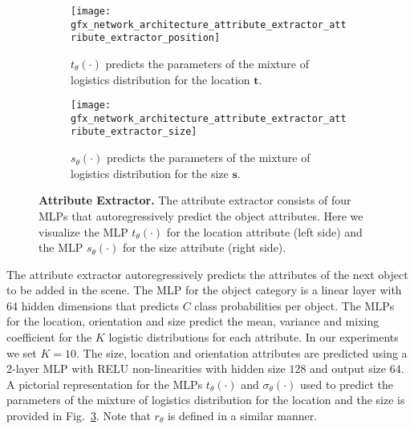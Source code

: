 \documentclass{article}
\newcommand{\bs}{\mathbf{s}}\newcommand{\bS}{\mathbf{S}}
\newcommand{\bt}{\mathbf{t}}\newcommand{\bT}{\mathbf{T}}
\newcommand{\boldparagraph}[1]{\vspace{0.2cm}\noindent{\bf #1:} }
\newcommand{\figref}[1]{Fig.~\ref{#1}}
\begin{document}
\begin{figure}[!h]
    \vspace{-0.8em}
    \centering
    \begin{subfigure}[t]{0.48\columnwidth}
        \centering
        \texttt{[image: gfx\_network\_architecture\_attribute\_extractor\_attribute\_extractor\_position]}
        \vspace{-1.2em}
        \caption{$t_{\theta}(\cdot)$ predicts the parameters of the mixture of logistics distribution for the location $\bt$.}
        \label{fig:mlp_translation}
    \end{subfigure}\hfill
    \begin{subfigure}[t]{0.48\columnwidth}
        \centering
        \texttt{[image: gfx\_network\_architecture\_attribute\_extractor\_attribute\_extractor\_size]}
        \vspace{-1.2em}
        \caption{$s_{\theta}(\cdot)$ predicts the parameters of the mixture of logistics distribution for the size $\bs$.}
        \label{fig:mlp_size}
    \end{subfigure}
    \caption{{\bf{Attribute Extractor.}} The attribute extractor consists of
    four MLPs that autoregressively predict the object attributes. Here we
    visualize the MLP $t_\theta(\cdot)$ for the location attribute (left side)
    and the MLP $s_\theta(\cdot)$ for the size attribute (right side).}
    \label{fig:attribute_extractor}
    \vspace{-0.8em}
\end{figure}

\boldparagraph{Attribute Extractor}The attribute extractor autoregressively predicts the attributes of the next
object to be added in the scene. The MLP for the object category is a linear
layer with $64$ hidden dimensions that predicts $C$ class probabilities per
object. The MLPs for the location, orientation and size predict the mean,
variance and mixing coefficient for the $K$ logistic distributions for each
attribute. In our experiments we set $K=10$.  The size, location and
orientation attributes are predicted using a 2-layer MLP with RELU
non-linearities with hidden size $128$ and output size $64$. A pictorial
representation for the MLPs $t_\theta(\cdot)$ and $\sigma_\theta(\cdot)$ used to predict the
parameters of the mixture of logistics distribution for the location and the
size is provided in \figref{fig:attribute_extractor}. Note that
$r_\theta$ is defined in a similar manner.
\end{document}
